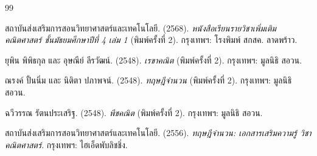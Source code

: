 \documentclass[a4paper,oneside,12pt]{book}
\begin{document}
\renewcommand{\bibname}{บรรณานุกรม}

\begin{thebibliography}{99}
	
สถาบันส่งเสริมการสอนวิทยาศาสตร์และเทคโนโลยี. (2568).
\textit{หนังสือเรียนรายวิชาเพิ่มเติมคณิตศาสตร์ ชั้นมัธยมศึกษาปีที่ 4 เล่ม 1} (พิมพ์ครั้งที่ 2).
กรุงเทพฯ: โรงพิมพ์ สกสค. ลาดพร้าว.

ยุพิน พิพิธกุล และ อุษณีย์ ลีรวัฒน์. (2548).
\textit{เรขาคณิต} (พิมพ์ครั้งที่ 2).
กรุงเทพฯ: มูลนิธิ สอวน.

ณรงค์ ปั้นนิ่ม และ นิติตา ปภาพจน์. (2548).
\textit{ทฤษฎีจำนวน} (พิมพ์ครั้งที่ 2).
กรุงเทพฯ: มูลนิธิ สอวน.

ฉวีวรรณ รัตนประเสริฐ. (2548).
\textit{พีชคณิต} (พิมพ์ครั้งที่ 2).
กรุงเทพฯ: มูลนิธิ สอวน.

สถาบันส่งเสริมการสอนวิทยาศาสตร์และเทคโนโลยี. (2556).
\textit{ทฤษฎีจำนวน: เอกสารเสริมความรู้ วิชาคณิตศาสตร์}.
กรุงเทพฯ: ไฮเอ็ดพับลิชชิ่ง.
	
\end{thebibliography}

\endgroup			
\end{document}
